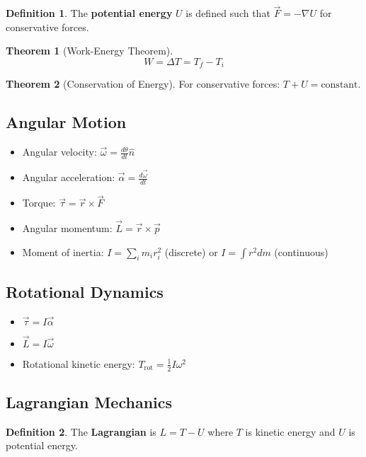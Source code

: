 \documentclass[11pt]{article}
\theoremstyle{definition}
\newtheorem{definition}{Definition}[section]
\newtheorem{theorem}{Theorem}[section]
\begin{document}
\begin{definition}
The \textbf{potential energy} $U$ is defined such that $\vec{F} = -\nabla U$ for conservative forces.
\end{definition}

\begin{theorem}[Work-Energy Theorem]
$$W = \Delta T = T_f - T_i$$
\end{theorem}

\begin{theorem}[Conservation of Energy]
For conservative forces: $T + U = \text{constant}$.
\end{theorem}

\subsection{Angular Motion}
\begin{itemize}
    \item Angular velocity: $\vec{\omega} = \frac{d\theta}{dt}\hat{n}$
    \item Angular acceleration: $\vec{\alpha} = \frac{d\vec{\omega}}{dt}$
    \item Torque: $\vec{\tau} = \vec{r} \times \vec{F}$
    \item Angular momentum: $\vec{L} = \vec{r} \times \vec{p}$
    \item Moment of inertia: $I = \sum_i m_i r_i^2$ (discrete) or $I = \int r^2 dm$ (continuous)
\end{itemize}

\subsection{Rotational Dynamics}
\begin{itemize}
    \item $\vec{\tau} = I\vec{\alpha}$
    \item $\vec{L} = I\vec{\omega}$
    \item Rotational kinetic energy: $T_{\text{rot}} = \frac{1}{2}I\omega^2$
\end{itemize}

\subsection{Lagrangian Mechanics}
\begin{definition}
The \textbf{Lagrangian} is $L = T - U$ where $T$ is kinetic energy and $U$ is potential energy.
\end{definition}
\end{document}
